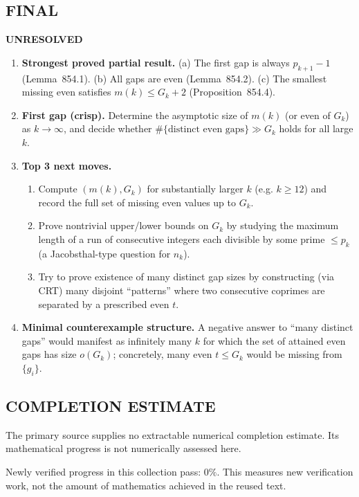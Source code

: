 \subsection*{FINAL}
\textbf{UNRESOLVED}
\begin{enumerate}
\item[(i)] \textbf{Strongest proved partial result.} (a) The first gap is always $p_{k+1}-1$ (Lemma~854.1). (b) All gaps are even (Lemma~854.2). (c) The smallest missing even satisfies $m(k)\le G_k+2$ (Proposition~854.4).
\item[(ii)] \textbf{First gap (crisp).} Determine the asymptotic size of $m(k)$ (or even of $G_k$) as $k\to\infty$, and decide whether $\#\{\text{distinct even gaps}\}\gg G_k$ holds for all large $k$.
\item[(iii)] \textbf{Top 3 next moves.}
  \begin{enumerate}
  \item Compute $(m(k),G_k)$ for substantially larger $k$ (e.g. $k\ge 12$) and record the full set of missing even values up to $G_k$.
  \item Prove nontrivial upper/lower bounds on $G_k$ by studying the maximum length of a run of consecutive integers each divisible by some prime $\le p_k$ (a Jacobsthal-type question for $n_k$).
  \item Try to prove existence of many distinct gap sizes by constructing (via CRT) many disjoint ``patterns'' where two consecutive coprimes are separated by a prescribed even $t$.
  \end{enumerate}
\item[(iv)] \textbf{Minimal counterexample structure.} A negative answer to ``many distinct gaps'' would manifest as infinitely many $k$ for which the set of attained even gaps has size $o(G_k)$; concretely, many even $t\le G_k$ would be missing from $\{g_i\}$.
\end{enumerate}



\subsection*{COMPLETION ESTIMATE}
The primary source supplies no extractable numerical completion estimate. Its mathematical progress is not numerically assessed here.

Newly verified progress in this collection pass: $0\%$. This measures new verification work, not the amount of mathematics achieved in the reused text.
